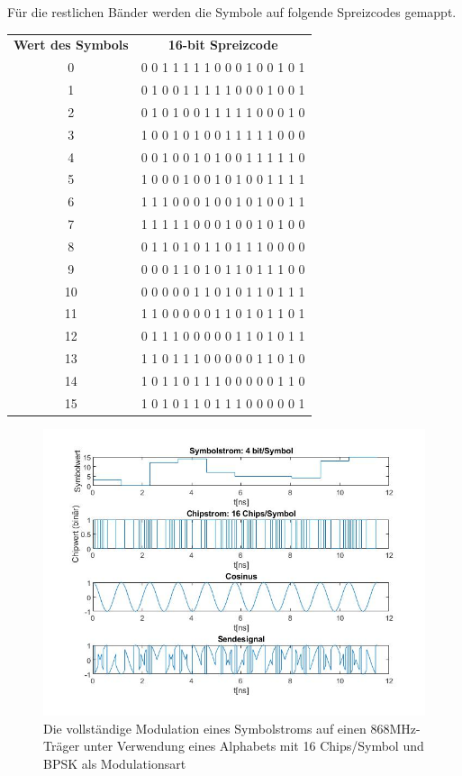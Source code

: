 Für die restlichen Bänder werden die Symbole auf folgende Spreizcodes gemappt. \cite[S.414]{ieee154}
\begin{center}
	\begin{tabular}{cc}
		\textbf{Wert des Symbols} & \textbf{16-bit Spreizcode} \\
		0&0 0 1 1 1 1 1 0 0 0 1 0 0 1 0 1\\
		1&0 1 0 0 1 1 1 1 1 0 0 0 1 0 0 1\\
		2&0 1 0 1 0 0 1 1 1 1 1 0 0 0 1 0\\
		3&1 0 0 1 0 1 0 0 1 1 1 1 1 0 0 0\\
		4&0 0 1 0 0 1 0 1 0 0 1 1 1 1 1 0\\
		5&1 0 0 0 1 0 0 1 0 1 0 0 1 1 1 1\\
		6&1 1 1 0 0 0 1 0 0 1 0 1 0 0 1 1\\
		7&1 1 1 1 1 0 0 0 1 0 0 1 0 1 0 0\\
		8&0 1 1 0 1 0 1 1 0 1 1 1 0 0 0 0\\
		9&0 0 0 1 1 0 1 0 1 1 0 1 1 1 0 0\\
		10&0 0 0 0 0 1 1 0 1 0 1 1 0 1 1 1\\
		11&1 1 0 0 0 0 0 1 1 0 1 0 1 1 0 1\\
		12&0 1 1 1 0 0 0 0 0 1 1 0 1 0 1 1\\
		13&1 1 0 1 1 1 0 0 0 0 0 1 1 0 1 0\\
		14&1 0 1 1 0 1 1 1 0 0 0 0 0 1 1 0\\
		15&1 0 1 0 1 1 0 1 1 1 0 0 0 0 0 1\\
	\end{tabular}
\end{center}
\begin{figure}
	\centering
	\includegraphics[width=\textwidth]{Grafiken-Alex/154modulation.jpg}
	\caption{Die vollständige Modulation eines Symbolstroms auf einen 868MHz-Träger unter Verwendung eines Alphabets mit 16 Chips/Symbol und BPSK als Modulationsart}
	\label{154modulation}
\end{figure}

